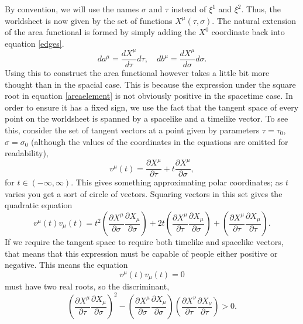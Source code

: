 \documentclass[a4paper,12pt]{article}
\numberwithin{equation}{section}
\begin{document}
By convention, we will use the names $\sigma$ and $\tau$ instead of $\xi^1$ and $\xi^2$. Thus, the worldsheet is now given by the set of functions $X^\mu(\tau, \sigma)$. The natural extension of the area functional is formed by simply adding the $X^0$ coordinate back into equation \ref{edges}.
\begin{equation}
da^\mu = \frac{dX^\mu}{d\tau}d\tau, \quad db^\mu = \frac{dX^\mu}{d\sigma}d\sigma.
\end{equation}
Using this to construct the area functional however takes a little bit more thought than in the spacial case. This is because the expression under the square root in equation \ref{areaelement} is not obviously positive in the spacetime case. In order to ensure it has a fixed sign, we use the fact that the tangent space of every point on the worldsheet is spanned by a spacelike and a timelike vector. To see this, consider the set of tangent vectors at a point given by parameters $\tau = \tau_0$, $\sigma = \sigma_0$ (although the values of the coordinates in the equations are omitted for readability), 
\begin{equation}
v^\mu(t) = \frac{\partial X ^ \mu}{\partial \tau} + t\frac{\partial X^\mu}{\partial \sigma},
\end{equation}
for $t \in (-\infty, \infty)$. This gives something approximating polar coordinates; as $t$ varies you get a sort of circle of vectors. Squaring vectors in this set gives the quadratic equation
\begin{equation}
v^\mu(t) v_\mu  (t) = t^2\left(\frac{\partial X^\mu}{\partial \sigma}\frac{\partial X_\mu}{\partial \sigma}\right) + 2t\left(\frac{\partial X^\mu}{\partial\tau}\frac{\partial X_\mu}{\partial\sigma}\right) + \left(\frac{\partial X^\mu}{\partial \tau}\frac{\partial X_\mu}{\partial \tau}\right).
\end{equation}
If we require the tangent space to require both timelike and spacelike vectors, that means that this expression must be capable of people either positive or negative. This means the equation
\begin{equation}
v^\mu(t)v_\mu(t) = 0
\end{equation}
must have two real roots, so the discriminant, 
\begin{equation}
\left(\frac{\partial X^\mu}{\partial \tau}\frac{\partial X_\mu}{\partial \sigma}\right)^2 - \left(\frac{\partial X^\mu}{\partial \sigma}\frac{\partial X_\mu}{\partial \sigma}\right)\left(\frac{\partial X^\nu}{\partial \tau}\frac{\partial X_\nu}{\partial \tau}\right) > 0.
\end{equation}
\end{document}
